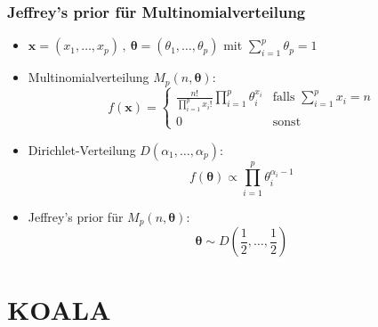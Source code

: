\documentclass[aspectratio=169,xcolor=dvipsnames]{beamer}
\begin{document}
\begin{frame}
\frametitle{Jeffrey's prior für Multinomialverteilung}
\begin{itemize}
\item<1-> $\boldsymbol{x}=(x_1,\dots,x_p)\,,~\boldsymbol{\theta}=(\theta_1,\dots,\theta_p)$ mit $\sum_{i=1}^p\theta_p = 1$
\item<2-> Multinomialverteilung $M_p(n,\boldsymbol{\theta})$: $$f(\boldsymbol{x})=\left\{\begin{array}{ll}
\frac{n!}{\prod_{i=1}^{p}x_i!}\prod_{i=1}^{p}\theta_i^{x_i} & \text{falls }\sum_{i=1}^{p}x_i=n\\
0 & \text{sonst}
\end{array}\right.$$
\item<3-> Dirichlet-Verteilung $D(\alpha_1,\dots,\alpha_p)$: $$f(\boldsymbol{\theta})\propto\prod_{i=1}^{p}\theta_i^{\alpha_i-1}$$
\item<4-> Jeffrey's prior für $M_p(n,\boldsymbol{\theta})$:
$$\boldsymbol{\theta}\sim D\left(\frac{1}{2},\dots,\frac{1}{2}\right)$$
\end{itemize}
\end{frame}

\section{KOALA}
\end{document}
